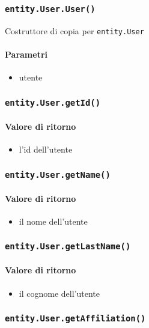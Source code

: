 \subsubsection{\texttt{entity.User.User()}}
Costruttore di copia per \texttt{entity.User}
\paragraph{Parametri}
\begin{itemize}
\item utente
\end{itemize}

\subsubsection{\texttt{entity.User.getId()}}
\paragraph{Valore di ritorno}
\begin{itemize}
\item l'id dell'utente
\end{itemize}

\subsubsection{\texttt{entity.User.getName()}}
\paragraph{Valore di ritorno}
\begin{itemize}
\item il nome dell'utente
\end{itemize}

\subsubsection{\texttt{entity.User.getLastName()}}
\paragraph{Valore di ritorno}
\begin{itemize}
\item il cognome dell'utente
\end{itemize}

\subsubsection{\texttt{entity.User.getAffiliation()}}
